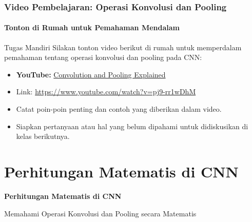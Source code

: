 \documentclass[t,aspectratio=169,xcolor=dvipsnames]{beamer}
\begin{document}
\begin{frame}
    \frametitle{Video Pembelajaran: Operasi Konvolusi dan Pooling}
    \framesubtitle{Tonton di Rumah untuk Pemahaman Mendalam}

    \begin{block}{Tugas Mandiri}
        Silakan tonton video berikut di rumah untuk memperdalam pemahaman tentang operasi konvolusi dan pooling pada CNN:
        \begin{itemize}
            \item \textbf{YouTube:} \href{https://www.youtube.com/watch?v=pj9-rr1wDhM}{Convolution and Pooling Explained}
            \item Link: \href{https://www.youtube.com/watch?v=pj9-rr1wDhM}{https://www.youtube.com/watch?v=pj9-rr1wDhM}
        \end{itemize}
    \end{block}

    \begin{itemize}
        \item Catat poin-poin penting dan contoh yang diberikan dalam video.
        \item Siapkan pertanyaan atau hal yang belum dipahami untuk didiskusikan di kelas berikutnya.
    \end{itemize}
\end{frame}

\section{Perhitungan Matematis di CNN}

\begin{frame}[plain]
    \begin{center}
        \vspace{3cm}
        {\Huge \textbf{Perhitungan Matematis di CNN}}
        \vspace{0.5cm}
        
        {\large Memahami Operasi Konvolusi dan Pooling secara Matematis}
    \end{center}
\end{frame}
\end{document}
